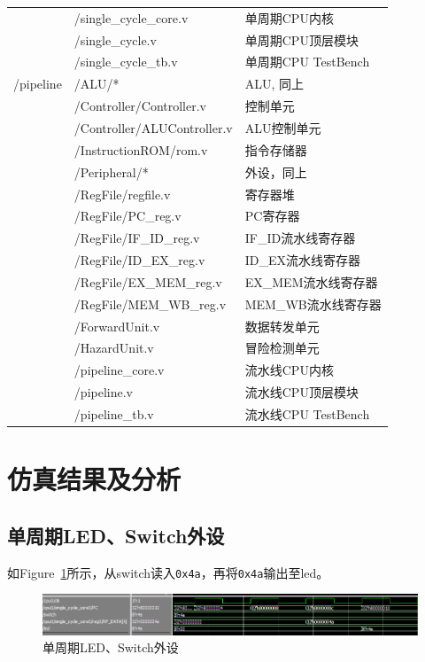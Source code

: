 \documentclass{article}
\begin{document}
\begin{longtable}{l|ll}
                & /single\_cycle\_core.v & 单周期CPU内核 \\
                & /single\_cycle.v & 单周期CPU顶层模块 \\
                & /single\_cycle\_tb.v & 单周期CPU TestBench \\
                \midrule
                /pipeline & /ALU/* & ALU, 同上 \\
                & /Controller/Controller.v & 控制单元 \\
                & /Controller/ALUController.v & ALU控制单元 \\
                & /InstructionROM/rom.v & 指令存储器 \\
                & /Peripheral/* & 外设，同上 \\
                & /RegFile/regfile.v & 寄存器堆 \\
                & /RegFile/PC\_reg.v & PC寄存器 \\
                & /RegFile/IF\_ID\_reg.v & IF\_ID流水线寄存器 \\
                & /RegFile/ID\_EX\_reg.v & ID\_EX流水线寄存器 \\
                & /RegFile/EX\_MEM\_reg.v & EX\_MEM流水线寄存器 \\
                & /RegFile/MEM\_WB\_reg.v & MEM\_WB流水线寄存器 \\
                & /ForwardUnit.v & 数据转发单元 \\
                & /HazardUnit.v & 冒险检测单元 \\
                & /pipeline\_core.v & 流水线CPU内核 \\
                & /pipeline.v & 流水线CPU顶层模块 \\
                & /pipeline\_tb.v & 流水线CPU TestBench \\
            \end{longtable}

    \section{仿真结果及分析}
        \subsection{单周期LED、Switch外设}
            如Figure~\ref{fig:singlecycle_ledswitch}所示，从switch读入\texttt{0x4a}，再将\texttt{0x4a}输出至led。
            \begin{figure}[H]
                \centering
                \includegraphics[width=\textwidth]{images/singlecycle_ledswitch.png}
                \caption{\label{fig:singlecycle_ledswitch}单周期LED、Switch外设}
            \end{figure}
\end{document}
